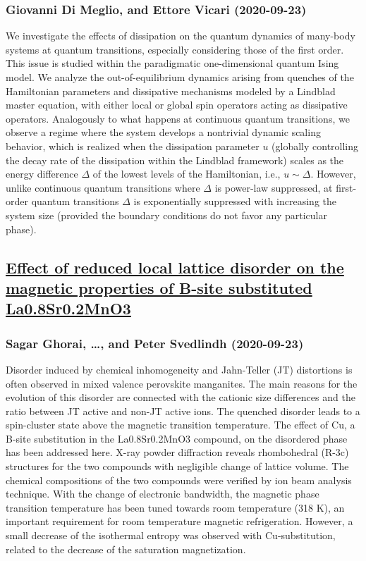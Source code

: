 \subsubsection*{Giovanni Di Meglio, and Ettore Vicari (2020-09-23)}
We investigate the effects of dissipation on the quantum dynamics of
many-body systems at quantum transitions, especially considering those of the
first order. This issue is studied within the paradigmatic one-dimensional
quantum Ising model. We analyze the out-of-equilibrium dynamics arising from
quenches of the Hamiltonian parameters and dissipative mechanisms modeled by a
Lindblad master equation, with either local or global spin operators acting as
dissipative operators. Analogously to what happens at continuous quantum
transitions, we observe a regime where the system develops a nontrivial dynamic
scaling behavior, which is realized when the dissipation parameter $u$
(globally controlling the decay rate of the dissipation within the Lindblad
framework) scales as the energy difference $\Delta$ of the lowest levels of the
Hamiltonian, i.e., $u\sim \Delta$. However, unlike continuous quantum
transitions where $\Delta$ is power-law suppressed, at first-order quantum
transitions $\Delta$ is exponentially suppressed with increasing the system
size (provided the boundary conditions do not favor any particular phase).

\subsection*{\href{http://arxiv.org/abs/2009.11157v1}{Effect of reduced local lattice disorder on the magnetic properties of  B-site substituted La0.8Sr0.2MnO3}}
\subsubsection*{Sagar Ghorai, \dots, and Peter Svedlindh (2020-09-23)}
Disorder induced by chemical inhomogeneity and Jahn-Teller (JT) distortions
is often observed in mixed valence perovskite manganites. The main reasons for
the evolution of this disorder are connected with the cationic size differences
and the ratio between JT active and non-JT active ions. The quenched disorder
leads to a spin-cluster state above the magnetic transition temperature. The
effect of Cu, a B-site substitution in the La0.8Sr0.2MnO3 compound, on the
disordered phase has been addressed here. X-ray powder diffraction reveals
rhombohedral (R-3c) structures for the two compounds with negligible change of
lattice volume. The chemical compositions of the two compounds were verified by
ion beam analysis technique. With the change of electronic bandwidth, the
magnetic phase transition temperature has been tuned towards room temperature
(318 K), an important requirement for room temperature magnetic refrigeration.
However, a small decrease of the isothermal entropy was observed with
Cu-substitution, related to the decrease of the saturation magnetization.

